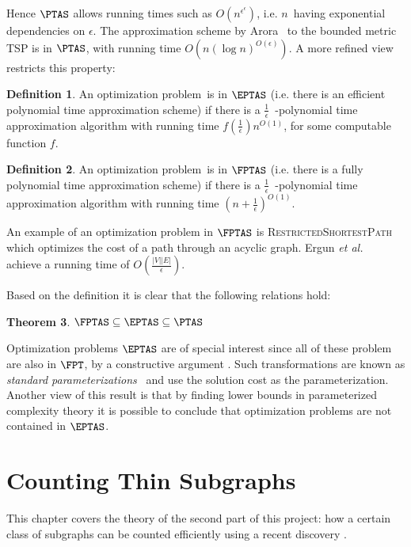 \documentclass[a4paper,11pt]{report}
\theoremstyle{plain}
\newtheorem{thm}{Theorem}[chapter] %
\theoremstyle{definition}
\newtheorem{defn}[thm]{Definition} %
\begin{document}
Hence $\PTAS$ allows running times such as $O(n^{\epsilon ^ \epsilon})$, i.e. $n$ having exponential dependencies on $\epsilon$.
The approximation scheme by Arora~\cite{ARORA96} to the bounded metric TSP is in $\PTAS$, with running time $O(n(\log n)^{O(\epsilon)})$.
A more refined view restricts this property:

\begin{defn}
An optimization problem is in $\EPTAS$ (i.e. there is an efficient polynomial time approximation scheme) if there is a $\frac{1}{\epsilon}$ -polynomial time approximation algorithm with 
running time $f(\frac{1}{\epsilon}) n^{O(1)}$, for some computable function $f$.
\end{defn}

\begin{defn}
An optimization problem is in $\FPTAS$ (i.e. there is a fully polynomial time approximation scheme) if there is a $\frac{1}{\epsilon}$ -polynomial time approximation algorithm with 
running time $(n + \frac{1}{\epsilon})^{O(1)}$.
\end{defn}

An example of an optimization problem in $\FPTAS$ is \textsc{RestrictedShortestPath} which optimizes the cost of a path through an acyclic graph.
Ergun \emph{et al.}~\cite{ergun02} achieve a running time of $O(\frac{|V| |E|}{\epsilon})$.

Based on the definition it is clear that the following relations hold:

\begin{thm}
$\FPTAS \subseteq \EPTAS \subseteq \PTAS$
\end{thm}

Optimization problems $\EPTAS$ are of special interest since all of these problem are also in $\FPT$, by a constructive argument \cite{FG06}.
Such transformations are known as \emph{standard parameterizations} \cite{FG06} and use the solution cost as the parameterization.
Another view of this result is that by finding lower bounds in parameterized complexity theory it is possible to conclude that optimization problems are not contained in $\EPTAS$.


\chapter{Counting Thin Subgraphs}
This chapter covers the theory of the second part of this project: how a certain class of subgraphs can be counted efficiently using a recent discovery \cite{BHKK13}.
\end{document}
